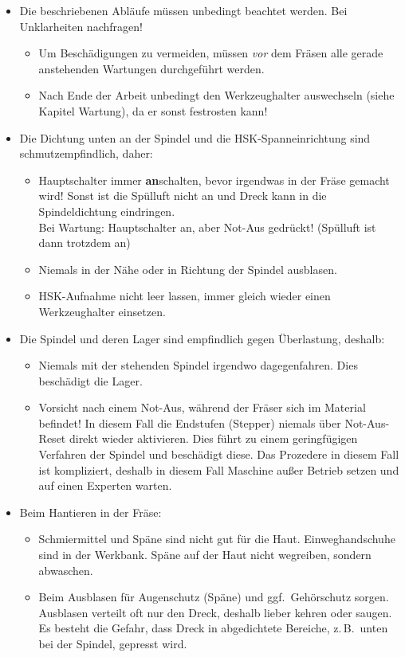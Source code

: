\documentclass{\basedir/fablab-document}
\begin{document}
\begin{itemize}
 \item Die beschriebenen Abläufe müssen unbedingt beachtet werden. Bei Unklarheiten nachfragen!
	\begin{itemize}
	\item Um Beschädigungen zu vermeiden, müssen \emph{vor} dem Fräsen alle gerade anstehenden Wartungen durchgeführt werden.
	\item Nach Ende der Arbeit unbedingt den Werkzeughalter auswechseln (siehe Kapitel Wartung), da er sonst festrosten kann!
	\end{itemize}
 \item Die Dichtung unten an der Spindel und die HSK-Spanneinrichtung sind schmutzempfindlich, daher:
 \begin{itemize}
  \item Hauptschalter immer \textbf{an}schalten, bevor irgendwas in der Fräse gemacht wird! Sonst ist die Spülluft nicht an und Dreck kann in die Spindeldichtung eindringen.\\Bei Wartung: Hauptschalter an, aber Not-Aus gedrückt! (Spülluft ist dann trotzdem an)
  \item Niemals in der Nähe oder in Richtung der Spindel ausblasen.
  \item HSK-Aufnahme nicht leer lassen, immer gleich wieder einen Werkzeughalter einsetzen.
 \end{itemize}
\item Die Spindel und deren Lager sind empfindlich gegen Überlastung, deshalb: 
 \begin{itemize}
  \item Niemals mit der stehenden Spindel irgendwo dagegenfahren. Dies beschädigt die Lager.
  \item Vorsicht nach einem Not-Aus, während der Fräser sich im Material befindet! In diesem Fall die Endstufen (Stepper) niemals über Not-Aus-Reset direkt wieder aktivieren. Dies führt zu einem geringfügigen Verfahren der Spindel und beschädigt diese. 
Das Prozedere in diesem Fall ist kompliziert, deshalb in diesem Fall Maschine außer Betrieb setzen und auf einen Experten warten.
\end{itemize}
	\item Beim Hantieren in der Fräse:
\begin{itemize}
	\item Schmiermittel und Späne sind nicht gut für die Haut. Einweghandschuhe sind in der Werkbank. Späne auf der Haut nicht wegreiben, sondern abwaschen.
	\item Beim Ausblasen für Augenschutz (Späne) und ggf.\  Gehörschutz sorgen. Ausblasen verteilt oft nur den Dreck, deshalb lieber kehren oder saugen. Es besteht die Gefahr, dass Dreck in abgedichtete Bereiche, z.\,B.\  unten bei der Spindel, gepresst wird.

\end{itemize}
\end{itemize}
\end{document}
